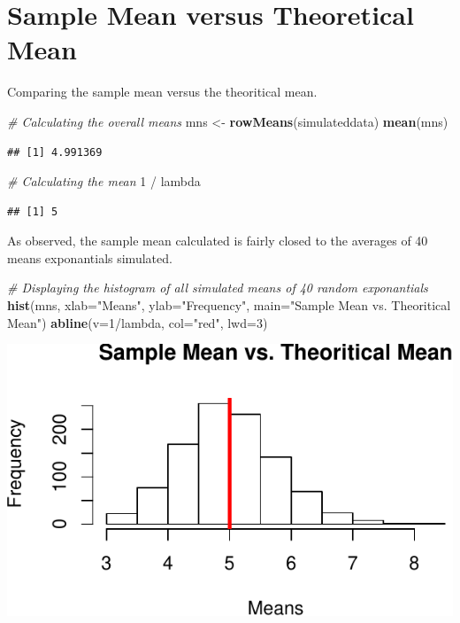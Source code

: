 \documentclass[]{article}
\newenvironment{Shaded}{\begin{snugshade}}{\end{snugshade}}
\newcommand{\KeywordTok}[1]{\textcolor[rgb]{0.13,0.29,0.53}{\textbf{{#1}}}}
\newcommand{\DataTypeTok}[1]{\textcolor[rgb]{0.13,0.29,0.53}{{#1}}}
\newcommand{\DecValTok}[1]{\textcolor[rgb]{0.00,0.00,0.81}{{#1}}}
\newcommand{\StringTok}[1]{\textcolor[rgb]{0.31,0.60,0.02}{{#1}}}
\newcommand{\CommentTok}[1]{\textcolor[rgb]{0.56,0.35,0.01}{\textit{{#1}}}}
\newcommand{\NormalTok}[1]{{#1}}
\begin{document}
\section{Sample Mean versus Theoretical
Mean}\label{sample-mean-versus-theoretical-mean}

Comparing the sample mean versus the theoritical mean.

\begin{Shaded}
\begin{Highlighting}[]
\CommentTok{# Calculating the overall means}
\NormalTok{mns <-}\StringTok{ }\KeywordTok{rowMeans}\NormalTok{(simulateddata)}
\KeywordTok{mean}\NormalTok{(mns)}
\end{Highlighting}
\end{Shaded}

\begin{verbatim}
## [1] 4.991369
\end{verbatim}

\begin{Shaded}
\begin{Highlighting}[]
\CommentTok{# Calculating the mean}
\DecValTok{1} \NormalTok{/}\StringTok{ }\NormalTok{lambda}
\end{Highlighting}
\end{Shaded}

\begin{verbatim}
## [1] 5
\end{verbatim}

As observed, the sample mean calculated is fairly closed to the averages
of 40 means exponantials simulated.

\begin{Shaded}
\begin{Highlighting}[]
\CommentTok{# Displaying the histogram of all simulated means of 40 random exponantials}
\KeywordTok{hist}\NormalTok{(mns, }\DataTypeTok{xlab=}\StringTok{"Means"}\NormalTok{, }\DataTypeTok{ylab=}\StringTok{"Frequency"}\NormalTok{, }\DataTypeTok{main=}\StringTok{"Sample Mean vs. Theoritical Mean"}\NormalTok{)}
\KeywordTok{abline}\NormalTok{(}\DataTypeTok{v=}\DecValTok{1}\NormalTok{/lambda, }\DataTypeTok{col=}\StringTok{"red"}\NormalTok{, }\DataTypeTok{lwd=}\DecValTok{3}\NormalTok{)}
\end{Highlighting}
\end{Shaded}

\includegraphics{statinference-courseproject-1-Question-1_files/figure-latex/unnamed-chunk-3-1.pdf}
\end{document}
